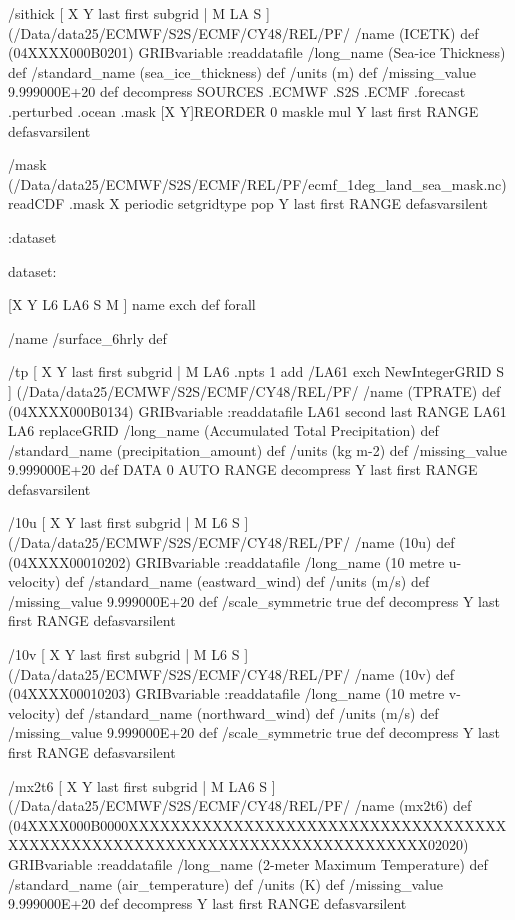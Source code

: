 \begin{ingrid}
/sithick { [ X Y last first subgrid | M LA S ] (/Data/data25/ECMWF/S2S/ECMF/CY48/REL/PF/%
/name (ICETK) def
(04XXXX000B0201) GRIBvariable
:readdatafile
/long_name (Sea-ice Thickness) def
/standard_name (sea_ice_thickness) def
/units (m) def
/missing_value 9.999000E+20 def
decompress
  SOURCES .ECMWF .S2S .ECMF .forecast .perturbed .ocean .mask
  [X Y]REORDER
   0 maskle
   mul
Y last first RANGE
} defasvarsilent

/mask { (/Data/data25/ECMWF/S2S/ECMF/REL/PF/ecmf_1deg_land_sea_mask.nc) readCDF .mask
X periodic setgridtype pop
Y last first RANGE
} defasvarsilent

:dataset

dataset:

[X Y L6 LA6 S M ] {name exch def } forall

/name /surface_6hrly def

/tp { [ X Y last first subgrid | M LA6 .npts 1 add /LA61 exch NewIntegerGRID S ] (/Data/data25/ECMWF/S2S/ECMF/CY48/REL/PF/%
/name (TPRATE) def
(04XXXX000B0134) GRIBvariable
:readdatafile
LA61 second last RANGE
LA61 LA6 replaceGRID
/long_name (Accumulated Total Precipitation) def
/standard_name (precipitation_amount) def
/units (kg m-2) def
/missing_value 9.999000E+20 def
DATA 0 AUTO RANGE
decompress
Y last first RANGE
} defasvarsilent

/10u { [ X Y last first subgrid | M L6 S ] (/Data/data25/ECMWF/S2S/ECMF/CY48/REL/PF/%
/name (10u) def
(04XXXX00010202) GRIBvariable
:readdatafile
/long_name (10 metre u-velocity) def
/standard_name (eastward_wind) def
/units (m/s) def
/missing_value 9.999000E+20 def
/scale_symmetric true def
decompress
Y last first RANGE
} defasvarsilent

/10v { [ X Y last first subgrid | M L6 S ] (/Data/data25/ECMWF/S2S/ECMF/CY48/REL/PF/%
/name (10v) def
(04XXXX00010203) GRIBvariable
:readdatafile
/long_name (10 metre v-velocity) def
/standard_name (northward_wind) def
/units (m/s) def
/missing_value 9.999000E+20 def
/scale_symmetric true def
decompress
Y last first RANGE
} defasvarsilent


/mx2t6 { [ X Y last first subgrid | M LA6 S ] (/Data/data25/ECMWF/S2S/ECMF/CY48/REL/PF/%
/name (mx2t6) def
(04XXXX000B0000XXXXXXXXXXXXXXXXXXXXXXXXXXXXXXXXXXXXXXXXXXXXXXXXXXXXXXXXXXXXXXXXXXXXXXXXXXXX02020) GRIBvariable
:readdatafile
/long_name (2-meter Maximum Temperature) def
/standard_name (air_temperature) def
/units (K) def
/missing_value 9.999000E+20 def
decompress
Y last first RANGE
} defasvarsilent


\end{ingrid}
